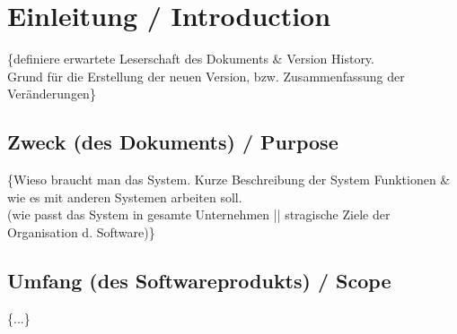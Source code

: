 \documentclass[11pt,a4paper]{article}
\begin{document}
%
%
%


\section{Einleitung / Introduction} %
	\{definiere erwartete Leserschaft des Dokuments \& Version History.\\
    Grund für die Erstellung der neuen Version, bzw. Zusammenfassung der Veränderungen\}
 	\subsection{Zweck (des Dokuments) / Purpose} %
	\{Wieso braucht man das System. Kurze Beschreibung der System Funktionen \& wie es mit anderen Systemen arbeiten soll.\\
	(wie passt das System in gesamte Unternehmen || stragische Ziele der Organisation d. Software)\}
  	\subsection{Umfang (des Softwareprodukts) / Scope} %
   \{...\}
\end{document}
